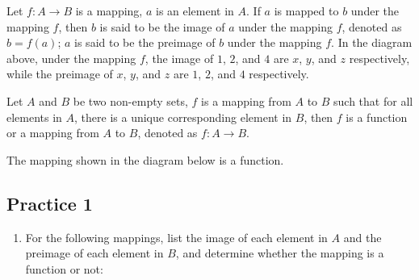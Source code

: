 \documentclass[12pt]{report}
\begin{document}
Let $f:A \to B$ is a mapping, $a$ is an element in $A$. If $a$ is mapped to $b$
under the mapping $f$, then $b$ is said to be the image of $a$ under the
mapping $f$, denoted as $b = f (a)$; $a$ is said to be the preimage of $b$
under the mapping $f$. In the diagram above, under the mapping $f$, the image
of $1$, $2$, and $4$ are $x$, $y$, and $z$ respectively, while the preimage of
$x$, $y$, and $z$ are $1$, $2$, and $4$ respectively.

\begin{mdframed}[style=MyFrame]
  Let $A$ and $B$ be two non-empty sets, $f$ is a mapping from $A$ to $B$ such that for all elements in $A$, there is a unique corresponding element in $B$, then $f$ is a function or a mapping from $A$ to $B$, denoted as $f:A \to B$.
\end{mdframed}

\newpage

The mapping shown in the diagram below is a function.
\begin{center}
\end{center}

\subsection{Practice 1}

\begin{enumerate}[leftmargin=15pt]
  \item For the following mappings, list the image of each element in $A$ and the
        preimage of each element in $B$, and determine whether the mapping is a
        function or not:
\end{enumerate}
\end{document}
